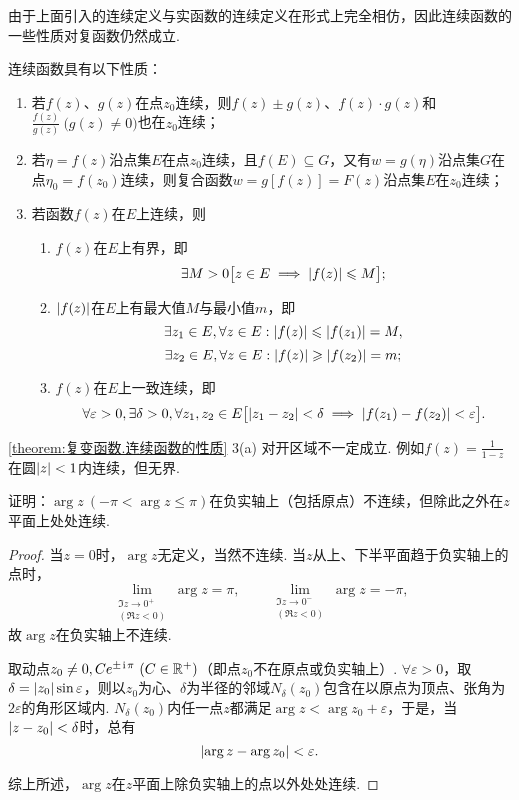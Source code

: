 由于上面引入的连续定义与实函数的连续定义在形式上完全相仿，因此连续函数的一些性质对复函数仍然成立.
\begin{property}\label{theorem:复变函数.连续函数的性质}
连续函数具有以下性质：
\begin{enumerate}
\item 若\(f(z)\)、\(g(z)\)在点\(z_0\)连续，则\(f(z) \pm g(z)\)、\(f(z) \cdot g(z)\)和\(\frac{f(z)}{g(z)}\ \bigl(g(z) \neq 0\bigr)\)也在\(z_0\)连续；

\item 若\(\eta = f(z)\)沿点集\(E\)在点\(z_0\)连续，且\(f(E) \subseteq G\)，又有\(w=g(\eta)\)沿点集\(G\)在点\(\eta_0=f(z_0)\)连续，则复合函数\(w=g[f(z)]=F(z)\)沿点集\(E\)在\(z_0\)连续；

\item 若函数\(f(z)\)在\(E\)上连续，则\begin{enumerate}
\item\label{theorem:复变函数.连续函数的性质.3a} \(f(z)\)在\(E\)上有界，即\[
\exists M>0 \bigl[
z \in E \implies \abs{f(z)} \leqslant M
\bigr];
\]

\item\label{theorem:复变函数.连续函数的性质.3b} \(\abs{f(z)}\)在\(E\)上有最大值\(M\)与最小值\(m\)，即\[
\exists z_1 \in E, \forall z \in E : \abs{f(z)} \leqslant \abs{f(z_1)} = M,
\]\[
\exists z_2 \in E, \forall z \in E : \abs{f(z)} \geqslant \abs{f(z_2)} = m;
\]

\item\label{theorem:复变函数.连续函数的性质.3c} \(f(z)\)在\(E\)上一致连续，即\[
\forall \varepsilon>0, \exists \delta>0, \forall z_1,z_2 \in E \bigl[
\abs{z_1-z_2}<\delta
\implies
\abs{f(z_1)-f(z_2)}<\varepsilon
\bigr].
\]
\end{enumerate}
\end{enumerate}
\end{property}
\cref{theorem:复变函数.连续函数的性质}  3(a) 对开区域不一定成立.
例如\(f(z) = \frac{1}{1-z}\)在圆\(\abs{z} < 1\)内连续，但无界.

\begin{example}
证明：\(\arg z\ (-\pi < \arg z \leqslant \pi)\)在负实轴上（包括原点）不连续，但除此之外在\(z\)平面上处处连续.
\begin{proof}
当\(z = 0\)时，\(\arg z\)无定义，当然不连续.
当\(z\)从上、下半平面趋于负实轴上的点时，\[
\lim\limits_{\substack{\Im z \to 0^+ \\ (\Re z < 0)}} \arg z = \pi,
\qquad
\lim\limits_{\substack{\Im z \to 0^- \\ (\Re z < 0)}} \arg z = -\pi,
\]故\(\arg z\)在负实轴上不连续.

取动点\(z_0\neq0,Ce^{\pm\iu\pi}\ (C\in\mathbb{R}^+)\)（即点\(z_0\)不在原点或负实轴上）.
\(\forall \varepsilon > 0\)，取\(\delta = \abs{z_0} \sin\varepsilon\)，则以\(z_0\)为心、\(\delta\)为半径的邻域\(N_{\delta}(z_0)\)包含在以原点为顶点、张角为\(2\varepsilon\)的角形区域内.
\(N_{\delta}(z_0)\)内任一点\(z\)都满足\(\arg z < \arg z_0 + \varepsilon\)，于是，当\(\abs{z - z_0} < \delta\)时，总有\[
\abs{\arg z - \arg z_0} < \varepsilon.
\]

综上所述，\(\arg z\)在\(z\)平面上除负实轴上的点以外处处连续.
\end{proof}
\end{example}
